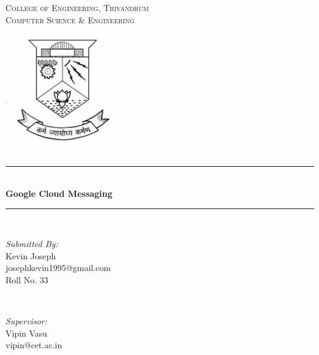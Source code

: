 \nocite{*}
\begin{titlepage}
\newcommand{\HRule}{\rule{\linewidth}{0.5mm}} %

\center %
 

\textsc{\LARGE College of Engineering, Trivandrum}\\[1.5cm] %
\textsc{\Large Computer Science \& Engineering}\\[0.5cm] %
\includegraphics[width=5cm]{images/logo.jpg}

\HRule \\[0.4cm]
{ \huge \bfseries Google Cloud Messaging}\\[0.4cm] %
\HRule \\[1.5cm]
 

\begin{minipage}{0.4\textwidth}
\begin{flushleft} \large
\emph{Submitted By:}\\
Kevin Joseph\\
josephkevin1995@gmail.com\\
Roll No. 33 %
\end{flushleft}
\end{minipage}
~
\begin{minipage}{0.4\textwidth}
\begin{flushright} \large
\emph{Supervisor:} \\
Vipin Vasu\\
vipin@cet.ac.in\\ %
\end{flushright}
\end{minipage}\\[2cm]


\end{titlepage}
